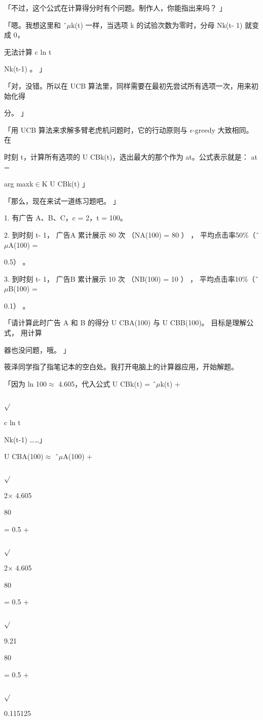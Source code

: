 「不过，这个公式在计算得分时有个问题。制作人，你能指出来吗？ 」\par
「嗯。我想这里和 ˆ$\mu$k(t) 一样，当选项 k 的试验次数为零时，分母 Nk(t- 1) 就变成 0，\par
无法计算 c ln t\par
Nk(t-1) 。 」\par
「对，没错。所以在 UCB 算法里，同样需要在最初先尝试所有选项一次，用来初始化得\par
分。 」\par
「用 UCB 算法来求解多臂老虎机问题时，它的行动原则与 $\epsilon$-greedy 大致相同。在\par
时刻 t，计算所有选项的 U CBk(t)，选出最大的那个作为 at。公式表示就是： at =\par
arg maxk$\in$K U CBk(t) 」\par
「那么，现在来试一道练习题吧。 」\par
1. 有广告 A、B、C，c = 2，t = 100。\par
2. 到时刻 t- 1， 广告A 累计展示 80 次 （NA(100) = 80 ） ， 平均点击率50\%（ˆ$\mu$A(100) =\par
0.5） 。\par
3. 到时刻 t- 1， 广告B 累计展示 10 次 （NB(100) = 10 ） ， 平均点击率10\%（ˆ$\mu$B(100) =\par
0.1） 。\par
「请计算此时广告 A 和 B 的得分 U CBA(100) 与 U CBB(100)。 目标是理解公式， 用计算\par
器也没问题，哦。 」\par
筱泽同学指了指笔记本的空白处。我打开电脑上的计算器应用，开始解题。\par
「因为 ln 100$\approx$ 4.605，代入公式 U CBk(t) = ˆ$\mu$k(t) +\par
$\sqrt{}$\par
c ln t\par
Nk(t-1) ……」\par
U CBA(100)$\approx$ ˆ$\mu$A(100) +\par
$\sqrt{}$\par
2$\times$ 4.605\par
80\par
= 0.5 +\par
$\sqrt{}$\par
2$\times$ 4.605\par
80\par
= 0.5 +\par
$\sqrt{}$\par
9.21\par
80\par
= 0.5 +\par
$\sqrt{}$\par
0.115125\par


